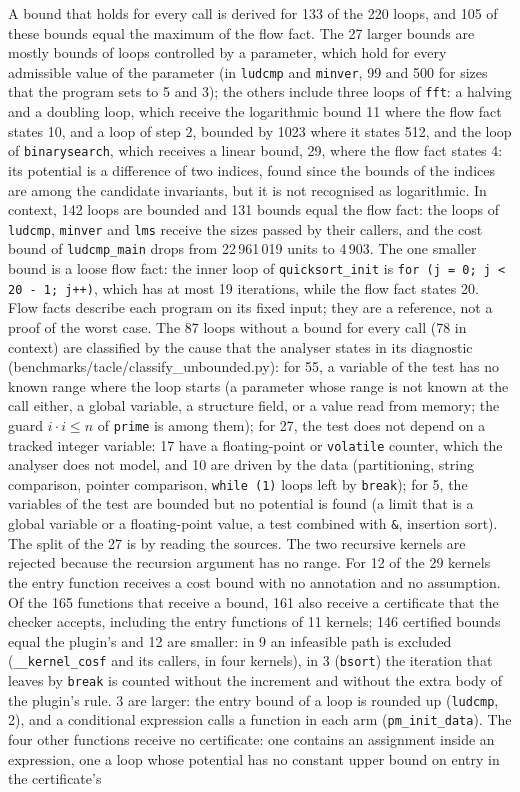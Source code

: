 \documentclass[oneside,english]{amsart}
\numberwithin{equation}{section}
\numberwithin{figure}{section}
\theoremstyle{plain}
\theoremstyle{definition}
\theoremstyle{plain}
\theoremstyle{remark}
\theoremstyle{plain}
\theoremstyle{definition}
\theoremstyle{plain}
\theoremstyle{remark}
\newcommand{\lean}[1]{{\ttfamily\small #1}}
\begin{document}
A bound that holds for every call is derived for 133 of the 220 loops, and 105 of these bounds equal the maximum of the flow fact. The 27 larger bounds are mostly bounds of loops controlled by a parameter, which hold for every admissible value of the parameter (in \texttt{ludcmp} and \texttt{minver}, 99 and 500 for sizes that the program sets to 5 and 3); the others include three loops of \texttt{fft}: a halving and a doubling loop, which receive the logarithmic bound 11 where the flow fact states 10, and a loop of step 2, bounded by 1023 where it states 512, and the loop of \texttt{binarysearch}, which receives a linear bound, 29, where the flow fact states 4: its potential is a difference of two indices, found since the bounds of the indices are among the candidate invariants, but it is not recognised as logarithmic. In context, 142 loops are bounded and 131 bounds equal the flow fact: the loops of \texttt{ludcmp}, \texttt{minver} and \texttt{lms} receive the sizes passed by their callers, and the cost bound of \texttt{ludcmp\_main} drops from 22\,961\,019 units to 4\,903. The one smaller bound is a loose flow fact: the inner loop of \texttt{quicksort\_init} is \texttt{for (j = 0; j < 20 - 1; j++)}, which has at most 19 iterations, while the flow fact states 20. Flow facts describe each program on its fixed input; they are a reference, not a proof of the worst case. The 87 loops without a bound for every call (78 in context) are classified by the cause that the analyser states in its diagnostic (\lean{benchmarks/tacle/classify\_unbounded.py}): for 55, a variable of the test has no known range where the loop starts (a parameter whose range is not known at the call either, a global variable, a structure field, or a value read from memory; the guard $i \cdot i \le n$ of \texttt{prime} is among them); for 27, the test does not depend on a tracked integer variable: 17 have a floating-point or \texttt{volatile} counter, which the analyser does not model, and 10 are driven by the data (partitioning, string comparison, pointer comparison, \texttt{while (1)} loops left by \texttt{break}); for 5, the variables of the test are bounded but no potential is found (a limit that is a global variable or a floating-point value, a test combined with \texttt{\&}, insertion sort). The split of the 27 is by reading the sources. The two recursive kernels are rejected because the recursion argument has no range. For 12 of the 29 kernels the entry function receives a cost bound with no annotation and no assumption. Of the 165 functions that receive a bound, 161 also receive a certificate that the checker accepts, including the entry functions of 11 kernels; 146 certified bounds equal the plugin's and 12 are smaller: in 9 an infeasible path is excluded (\texttt{\_\_kernel\_cosf} and its callers, in four kernels), in 3 (\texttt{bsort}) the iteration that leaves by \texttt{break} is counted without the increment and without the extra body of the plugin's rule. 3 are larger: the entry bound of a loop is rounded up (\texttt{ludcmp}, 2), and a conditional expression calls a function in each arm (\texttt{pm\_init\_data}). The four other functions receive no certificate: one contains an assignment inside an expression, one a loop whose potential has no constant upper bound on entry in the certificate's 
\end{document}
